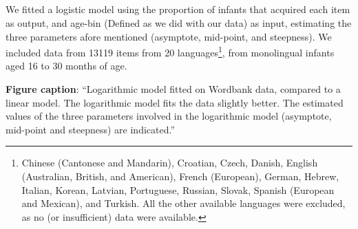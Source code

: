 \clearpage
\makeatletter
\efloat@restorefloats
\makeatother


\begin{appendix}
\section{}
We fitted a logistic model using the proportion of infants that acquired
each item as output, and age-bin (Defined as we did with our data) as
input, estimating the three parameters afore mentioned (asymptote,
mid-point, and steepness). We included data from 13119 items from 20
languages\footnote{Chinese (Cantonese and Mandarin), Croatian, Czech,
  Danish, English (Australian, British, and American), French
  (European), German, Hebrew, Italian, Korean, Latvian, Portuguese,
  Russian, Slovak, Spanish (European and Mexican), and Turkish. All the
  other available languages were excluded, as no (or insufficient) data
  were available.}, from monolingual infants aged 16 to 30 months of
age.

\textbf{Figure caption}: ``Logarithmic model fitted on Wordbank data,
compared to a linear model. The logarithmic model fits the data slightly
better. The estimated values of the three parameters involved in the
logarithmic model (asymptote, mid-point and steepness) are indicated.''
\end{appendix}
